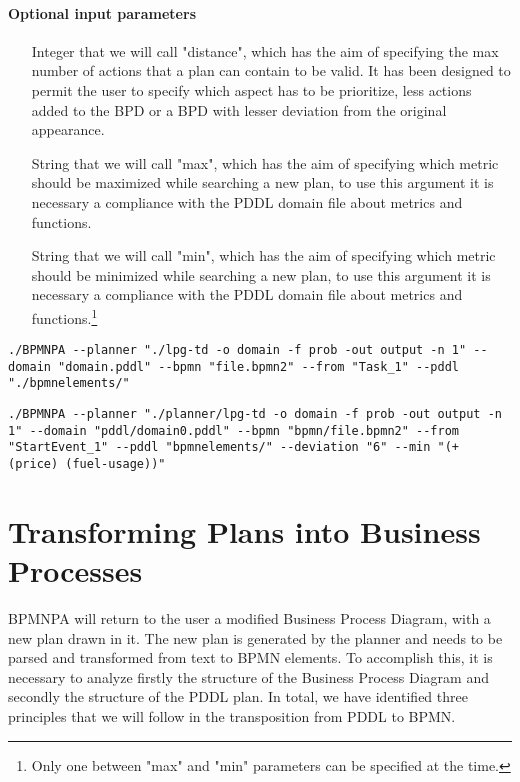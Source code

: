 \newpage
\paragraph{Optional input parameters}
\begin{itemize}
	\item[Integer] that we will call "distance", which has the aim of specifying the max number of actions that a plan can contain to be valid. It has been designed to permit the user to specify which aspect has to be prioritize, less actions added to the BPD or a BPD with lesser deviation from the original appearance.
	 
	\item[String] that we will call "max", which has the aim of specifying which metric should be maximized while searching a new plan, to use this argument it is necessary a compliance with the PDDL domain file about metrics and functions.
	
	\item[String] that we will call "min", which has the aim of specifying which metric should be minimized while searching a new plan, to use this argument it is necessary a compliance with the PDDL domain file about metrics and functions.\footnote{Only one between "max" and "min" parameters can be specified at the time.}

\end{itemize}

\begin{lstlisting}[caption=Input example with only mandatory parameters using bash.]
./BPMNPA --planner "./lpg-td -o domain -f prob -out output -n 1" --domain "domain.pddl" --bpmn "file.bpmn2" --from "Task_1" --pddl "./bpmnelements/"
\end{lstlisting}

\begin{lstlisting}[caption=Input example with optional parameters using bash.]
./BPMNPA --planner "./planner/lpg-td -o domain -f prob -out output -n 1" --domain "pddl/domain0.pddl" --bpmn "bpmn/file.bpmn2" --from "StartEvent_1" --pddl "bpmnelements/" --deviation "6" --min "(+ (price) (fuel-usage))"
\end{lstlisting}
	


\section{Transforming Plans into Business Processes}
\label{sec:456}
BPMNPA will return to the user a modified Business Process Diagram, with a new plan drawn in it. 
The new plan is generated by the planner and needs to be parsed and transformed from text to BPMN elements. 
To accomplish this, it is necessary to analyze firstly the structure of the Business Process Diagram and secondly the structure of the PDDL plan. In total, we have identified three principles that we will follow in the transposition from PDDL to BPMN.

